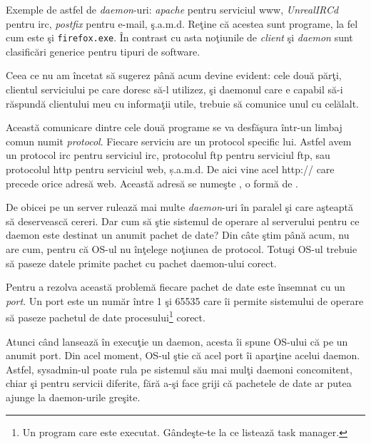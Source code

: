 Exemple de astfel de \textit{daemon}-uri: \textsl{apache} pentru serviciul
www, \textsl{UnrealIRCd} pentru irc,
\textsl{postfix} pentru e-mail, ş.a.m.d. Reţine că acestea sunt programe, la fel
cum este şi \texttt{firefox.exe}. În contrast cu asta noţiunile de \textit{client} şi
\textit{daemon} sunt clasificări
generice pentru tipuri de software.

Ceea ce nu am încetat să sugerez până acum devine evident: cele două părţi, clientul
serviciului pe care doresc să-l utilizez, şi daemonul care e capabil să-i răspundă
clientului meu cu informaţii utile, trebuie să comunice unul cu celălalt.

Această comunicare dintre cele două programe se va desfăşura într-un limbaj comun numit
\textsl{protocol}. Fiecare serviciu are un protocol specific lui. Astfel avem un
protocol irc pentru serviciul irc, protocolul ftp pentru serviciul ftp,
sau protocolul http pentru serviciul web, ș.a.m.d. De aici vine acel {\glqq}http://{\grqq} care precede
orice adresă web. Această adresă se numeşte
,
o formă de .

De obicei pe un server rulează mai multe \textit{daemon}-uri în paralel şi care
aşteaptă să deservească cereri. Dar cum să ştie sistemul de operare al serverului
pentru ce daemon este destinat un anumit pachet de date? Din câte ştim până acum,
nu are cum, pentru că OS-ul nu înţelege noţiunea de {\glqq}protocol{\grqq}. Totuşi OS-ul trebuie
să paseze datele primite pachet cu pachet daemon-ului corect.

Pentru a rezolva această problemă fiecare pachet de date este {\glqq}însemnat{\grqq} cu un \textsl{port}.
Un port este un număr între 1 şi 65535 care îi permite sistemului de operare să
paseze pachetul de date procesului\footnote{Un program care este executat. Gândeşte-te
la ce listează {\glqq}task manager{\grqq}.} corect.

Atunci când  lansează în execuţie un daemon,
acesta îi spune OS-ului că 
pe un anumit port. Din acel moment, OS-ul
{\glqq}ştie{\grqq} că acel port îi {\glqq}aparţine{\grqq} acelui daemon. Astfel, sysadmin-ul poate rula
pe sistemul său mai mulţi daemoni concomitent, chiar şi pentru servicii diferite, fără
a-şi face griji că pachetele de date ar putea ajunge la daemon-urile greşite.

